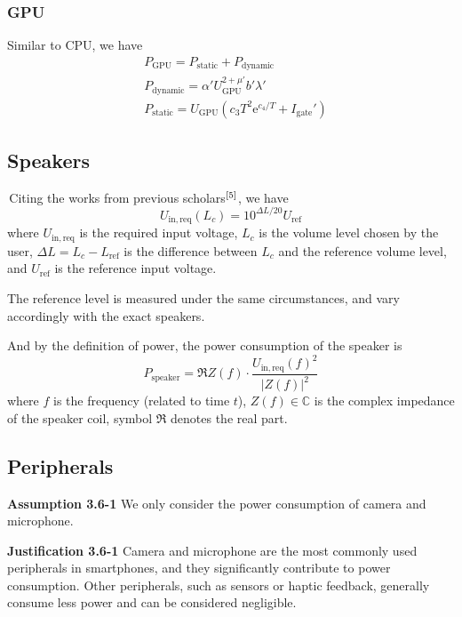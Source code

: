 \documentclass[12pt]{article}
\begin{document}
\subsubsection{GPU}

Similar to CPU, we have
\begin{eqnarray}
	& P_\mathrm{GPU}=P_\mathrm{static}+P_\mathrm{dynamic} \\
	& P_\mathrm{dynamic}=\alpha' U_\mathrm{GPU}^{2+\mu'}b'\lambda' \\
	& P_\mathrm{static}=U_\mathrm{GPU}\left(c_3T^2\mathrm e^{c_4/T}+I_\mathrm{gate}'\right)
\end{eqnarray}

\subsection{Speakers}

\quad \,Citing the works from previous scholars$\rm ^{[5]}$, we have
\begin{equation}
	U_\mathrm{in,req}(L_c)=10^{\Delta L/20}U_\mathrm{ref}
\end{equation}
where $U_\mathrm{in,req}$ is the required input voltage, $L_c$ is the volume level chosen by the user, $\Delta L=L_c-L_\mathrm{ref}$ is the difference between $L_c$ and the reference volume level, and $U_\mathrm{ref}$ is the reference input voltage.

The reference level is measured under the same circumstances, and vary accordingly with the exact speakers.

And by the definition of power, the power consumption of the speaker is
\begin{equation}
	P_\mathrm{speaker}=\Re Z(f)\cdot\frac{U_\mathrm{in,req}(f)^2}{|Z(f)|^2}
\end{equation}
where $f$ is the frequency (related to time $t$), $Z(f)\in\mathbb C$ is the complex impedance of the speaker coil, symbol $\Re$ denotes the real part.

\subsection{Peripherals}

\noindent \textbf{Assumption 3.6-1} \quad We only consider the power consumption of camera and microphone.

\noindent \textbf{Justification 3.6-1} \quad Camera and microphone are the most commonly used peripherals in smartphones, and they significantly contribute to power consumption. Other peripherals, such as sensors or haptic feedback, generally consume less power and can be considered negligible.
\end{document}
